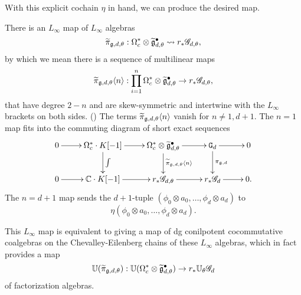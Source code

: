 %

With this explicit cochain $\eta$ in hand, we can produce the desired map.

\begin{prop}
There is an $L_\infty$ map of $L_\infty$ algebras
\[
\widetilde{\pi}_{\mathfrak g,d,\theta}: \Omega^*_c \otimes \widetilde{\mathfrak g}^\bullet_{d,\theta} \rightsquigarrow r_* \mathscr G_{d,\theta},
\]
by which we mean there is a sequence of multilinear maps
\[
\widetilde{\pi}_{\mathfrak g,d,\theta}\langle n\rangle: \prod_{i=1}^n \Omega^*_c \otimes \widetilde{\mathfrak g}^\bullet_{d,\theta} \to r_* \mathscr G_{d,\theta},
\]
that have degree $2-n$ and are skew-symmetric and intertwine with the $L_\infty$ brackets on both sides.
()
The terms $\widetilde{\pi}_{\mathfrak g,d,\theta}\langle n\rangle$ vanish for $n \neq 1, d+1$.
The $n =1$ map fits into the commuting diagram of short exact sequences
\[
\xymatrix{
0 \ar[r] & \Omega^*_c \cdot K [-1]  \ar[d]^{\int} \ar[r] & \Omega^*_c \otimes \Tilde{\fg}^\bullet_{d,\theta} \ar[d]^{\Tilde{\pi}_{\fg,d,\theta}\<n\>} \ar[r] & \mathtt{G}_d \ar[d]^{\pi_{\fg, d}} \ar[r] & 0 \\
0 \ar[r] & \CC \cdot K [-1] \ar[r] & r_*\sG_{d,\theta} \ar[r] & r_* \sG_{d} \ar[r] & 0 .
}
\]
The $n=d+1$ map sends the $d+1$-tuple $(\phi_0 \otimes a_0, \ldots, \phi_d \otimes a_d)$ to
\[
\eta(\phi_0 \otimes a_0, \ldots, \phi_d \otimes a_d).
\]

This $L_\infty$ map is equivalent to giving a map of dg conilpotent cocommutative coalgebras on the Chevalley-Eilenberg chains of these $L_\infty$ algebras,
which in fact provides a map
\[
\mathbb U(\widetilde{\pi}_{\mathfrak g,d,\theta}): \mathbb U(\Omega^*_c \otimes \widetilde{\mathfrak g}^\bullet_{d,\theta}) \to r_* \mathbb U_\theta\mathscr G_d
\]
of factorization algebras.
\end{prop}

